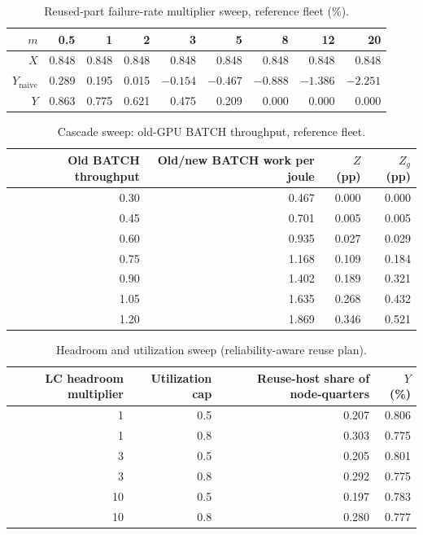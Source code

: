 \documentclass{article} %
\begin{document}
\begin{table}[h]
\caption{Reused-part failure-rate multiplier sweep, reference fleet (\%).}
\label{tab:mult_app}
\begin{center}
\small
\begin{tabular}{rrrrrrrrr}
\toprule
$m$ & 0.5 & 1 & 2 & 3 & 5 & 8 & 12 & 20 \\
\midrule
$X$ & 0.848 & 0.848 & 0.848 & 0.848 & 0.848 & 0.848 & 0.848 & 0.848 \\
$Y_{\text{naive}}$ & 0.289 & 0.195 & 0.015 & $-0.154$ & $-0.467$ & $-0.888$ & $-1.386$ & $-2.251$ \\
$Y$ & 0.863 & 0.775 & 0.621 & 0.475 & 0.209 & 0.000 & 0.000 & 0.000 \\
\bottomrule
\end{tabular}
\end{center}
\end{table}

\begin{table}[h]
\caption{Cascade sweep: old-GPU BATCH throughput, reference fleet.}
\label{tab:cascade_app}
\begin{center}
\small
\begin{tabular}{rrrr}
\toprule
Old BATCH throughput & Old/new BATCH work per joule & $Z$ (pp) & $Z_g$ (pp) \\
\midrule
0.30 & 0.467 & 0.000 & 0.000 \\
0.45 & 0.701 & 0.005 & 0.005 \\
0.60 & 0.935 & 0.027 & 0.029 \\
0.75 & 1.168 & 0.109 & 0.184 \\
0.90 & 1.402 & 0.189 & 0.321 \\
1.05 & 1.635 & 0.268 & 0.432 \\
1.20 & 1.869 & 0.346 & 0.521 \\
\bottomrule
\end{tabular}
\end{center}
\end{table}

\begin{table}[h]
\caption{Headroom and utilization sweep (reliability-aware reuse plan).}
\label{tab:headroom_app}
\begin{center}
\small
\begin{tabular}{rrrr}
\toprule
LC headroom multiplier & Utilization cap & Reuse-host share of node-quarters & $Y$ (\%) \\
\midrule
1 & 0.5 & 0.207 & 0.806 \\
1 & 0.8 & 0.303 & 0.775 \\
3 & 0.5 & 0.205 & 0.801 \\
3 & 0.8 & 0.292 & 0.775 \\
10 & 0.5 & 0.197 & 0.783 \\
10 & 0.8 & 0.280 & 0.777 \\
\bottomrule
\end{tabular}
\end{center}
\end{table}
\end{document}
